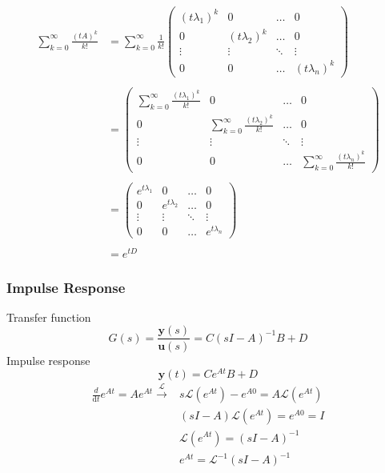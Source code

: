 \begin{ex}{}
\begin{equation*}
\begin{aligned}
\sum^{\infty}_{k=0}\frac{(tA)^{k}}{k!}  &=\sum^{\infty}_{k=0}\frac{1}{k!} \begin{pmatrix}
(t\lambda_{1})^{k}&0&\ldots&0\\
0&(t\lambda_{2})^{k}&\ldots&0\\
\vdots&\vdots&\ddots&\vdots\\
0&0&\ldots&(t\lambda_{n})^{k}
\end{pmatrix}\\\\
&=\begin{pmatrix}
\sum^{\infty}_{k=0}\frac{(t\lambda_{1})^{k}}{k!} &0&\ldots&0\\
0& \sum^{\infty}_{k=0}\frac{(t\lambda_{2})^{k}}{k!}&\ldots&0\\
\vdots&\vdots&\ddots&\vdots\\
0&0&\ldots&\sum^{\infty}_{k=0}\frac{(t\lambda_{n})^{k}}{k!}
\end{pmatrix}\\\\
&=\begin{pmatrix}
e^{t\lambda_{1}}&0&\ldots&0\\
0&e^{t\lambda_{2}}&\ldots&0\\
\vdots&\vdots&\ddots&\vdots\\
0&0&\ldots&e^{t\lambda_{n}}
\end{pmatrix}\\\\
&= e^{tD}
\end{aligned}
\end{equation*}
\end{ex}


\subsubsection{Impulse Response}
Transfer function\[G(s) = \frac{\mathbf{y}(s)}{\mathbf{u}(s)}=C(sI-A)^{-1}B+D\]
Impulse response\[\mathbf{y}(t) = Ce^{At}B+D\]
\begin{equation*}
\begin{split}
    \frac{d}{\mathrm{d}t}e^{At} = Ae^{At} \xrightarrow{\mathcal{L}} & s\mathcal{L}(e^{At})-e^{A0} = A\mathcal{L}(e^{At})\\
    &(sI-A)\mathcal{L}(e^{At}) = e^{A0} = I\\
    &\mathcal{L}(e^{At}) = (sI-A)^{-1}\\
    &e^{At} = \mathcal{L}^{-1}(sI-A)^{-1}\\
\end{split}
\end{equation*}

